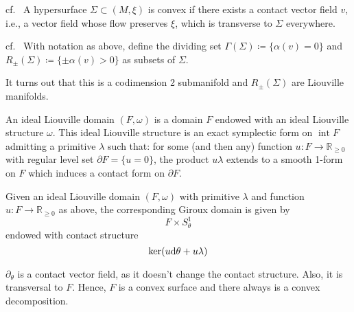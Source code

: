 \begin{definition}cf.~\cite[Definition 1.1.4]{HH19}
    A hypersurface $\Sigma \subset (M, \xi)$ is convex if there exists a contact
    vector field $v$, i.e., a vector field whose flow preserves $\xi$, which is transverse to $\Sigma$
    everywhere.
\end{definition}

\begin{definition}cf.~\cite[Definition 1.2.1]{HH19}
    With notation as above, define the dividing set $\Gamma(\Sigma) \coloneqq \{\alpha(v) = 0\}$ and $R_\pm(\Sigma) \coloneqq \{\pm \alpha(v) > 0\}$ 
    as subsets of $\Sigma$.
\end{definition}
It turns out that this is a codimension 2 submanifold and $R_\pm(\Sigma)$ are Liouville manifolds. 



\begin{definition} \cite[Definition 1]{Giroux20}
An ideal Liouville domain
$(F, \omega)$ is a domain $F$ endowed with an ideal Liouville structure $\omega$. This
ideal Liouville structure is an exact symplectic form on $\operatorname{int} F$
admitting a primitive $\lambda$ such that: for some (and then any) function 
$u \colon F \to \mathbb R_{\geq 0}$  with regular level set $\partial F = \{u = 0\}$,
the product $u\lambda$ extends to a smooth 1-form on $F$ which 
induces a contact form on $\partial F$.
\end{definition}

\begin{definition}\cite[Section 5.3]{MNW13}
    \label{def:giroux_domain}
    Given an ideal Liouville domain $(F, \omega)$ with primitive $\lambda$
    and function $u \colon F \to \mathbb R_{\geq 0}$ as above,
    the corresponding Giroux domain is given by
    \[
        F \times S^1_\theta
    \]
    endowed with contact structure
    \[
        \ker(u \mathrm{d} \theta + u \lambda)
    \]
\end{definition}
$\partial_\theta$ is a contact vector field, as it doesn't change the contact structure. 
Also, it is transversal to $F$. Hence, $F$ is a convex surface and there always is a convex decomposition.


